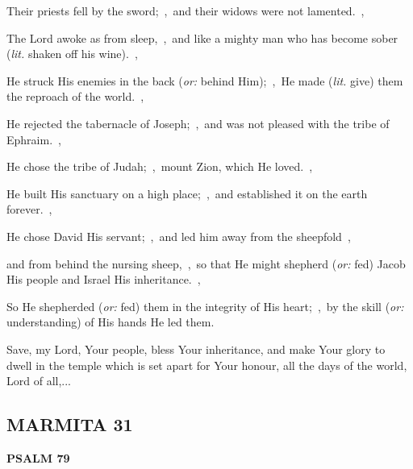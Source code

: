 \documentclass[12pt,twoside,a5paper]{article}
\newcommand{\marmita}[1]{\subsection*{MARMITA {#1}}}
\newcommand{\psalm}[1]{\textbf{PSALM {#1}}\nopagebreak}
\newcommand{\slota}[1]{\liturgicalhint{Slota.} #1}
\newcommand{\translationoption}[1]{\emph{or:} #1}
\newcommand{\translationliteral}[1]{\emph{lit.} #1}
\begin{document}
\begin{normalparskip}
  Their priests fell by the sword;~\sep\ and their widows were not lamented.~\sep

  The Lord awoke as from sleep,~\sep\ and like a mighty man who has become sober (\translationliteral{shaken off his wine}).~\sep

  He struck His enemies in the back (\translationoption{behind Him});~\sep\ He made (\translationliteral{give}) them the reproach of the world.~\sep

  He rejected the tabernacle of Joseph;~\sep\ and was not pleased with the tribe of Ephraim.~\sep

  He chose the tribe of Judah;~\sep\ mount Zion, which He loved.~\sep

  He built His sanctuary on a high place;~\sep\ and established it on the earth forever.~\sep

  He chose David His servant;~\sep\ and led him away from the sheepfold~\sep

  and from behind the nursing sheep,~\sep\ so that He might shepherd (\translationoption{fed}) Jacob His people and Israel His inheritance.~\sep

  So He shepherded (\translationoption{fed}) them in the integrity of His heart;~\sep\ by the skill (\translationoption{understanding}) of His hands He led them.
\end{normalparskip}

\slota{Save, my Lord, Your people, bless Your inheritance, and make Your glory to dwell in the temple which is set apart for Your honour, all the days of the world, Lord of all,...}

\marmita{31}

\psalm{79}
\end{document}
